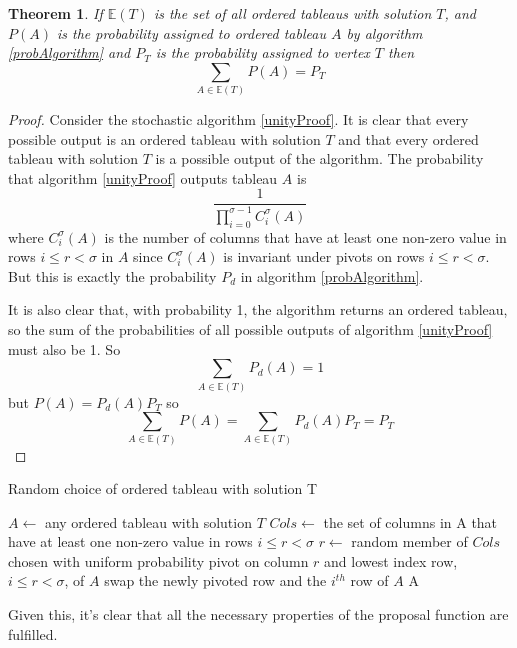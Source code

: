 \documentclass{article}
\newtheorem{theorem}{Theorem}
\begin{document}
\begin{theorem}
If $\mathbb{E}(T)$ is the set of all ordered tableaus with solution $T$, and $P(A)$ is the probability assigned to ordered tableau $A$ by algorithm \ref{probAlgorithm} and $P_T$ is the probability assigned to vertex $T$ then
\[
\sum_{A \in \mathbb{E}(T)} P(A) = P_T
\]
\end{theorem}
\begin{proof}
Consider the stochastic algorithm \ref{unityProof}. It is clear that every possible output is an ordered tableau with solution $T$ and that every ordered tableau with solution $T$ is a possible output of the algorithm. The probability that algorithm \ref{unityProof} outputs tableau $A$ is
\[
\frac{1}{\prod_{i=0}^{\sigma-1} C_i^\sigma(A)} 
\]
where $C_i^\sigma(A)$ is the number of columns that have at least one non-zero value in rows $i \le r < \sigma$ in $A$ since $C_i^\sigma(A)$ is invariant under pivots on rows $i \le r < \sigma$. But this is exactly the probability $P_d$ in algorithm \ref{probAlgorithm}.

It is also clear that, with probability 1, the algorithm returns an ordered tableau, so the sum of the probabilities of all possible outputs of algorithm \ref{unityProof} must also be 1. So
\[
\sum_{A \in \mathbb{E}(T)} P_d(A) = 1
\]
but $P(A) = P_d(A)P_T$ so 
\[
\sum_{A \in \mathbb{E}(T)} P(A) = \sum_{A \in \mathbb{E}(T)} P_d(A)P_T = P_T
\]
\end{proof}

\begin{algorithm}
\caption{Random choice of ordered tableau with solution T}
\label{unityProof}
\begin{algorithmic}
\State $A \leftarrow $ any ordered tableau with solution $T$
  \State $Cols \leftarrow$ the set of columns in A that have at least one non-zero value in rows $i \le r < \sigma$
  \State $r \leftarrow$ random member of $Cols$ chosen with uniform probability
  \State pivot on column $r$ and lowest index row, $i \le r < \sigma$, of $A$
  \State swap the newly pivoted row and the $i^{th}$ row of $A$
\EndFor
\State \Return A
\end{algorithmic}
\end{algorithm}

Given this, it's clear that all the necessary properties of the proposal function are fulfilled.

%
% 


\end{document}
